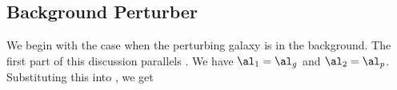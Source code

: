 \subsection{Background Perturber}\label{subsec:background}
We begin with the case when the perturbing galaxy is in the background. The first part of this discussion parallels \citet{Keeton03}.  We have $\al_1 = \al_g$ and $\al_2 = \al_p$. Substituting this into , we get